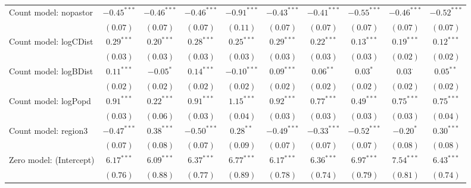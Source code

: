 \begin{sidewaystable}
\begin{center}
{\begin{tabular}{l c c c c c c c c c}
Count model: nopastor          & $-0.45^{***}$ & $-0.46^{***}$ & $-0.46^{***}$ & $-0.91^{***}$ & $-0.43^{***}$  & $-0.41^{***}$ & $-0.55^{***}$ & $-0.46^{***}$  & $-0.52^{***}$  \\
                               & $(0.07)$      & $(0.07)$      & $(0.07)$      & $(0.11)$      & $(0.07)$       & $(0.07)$      & $(0.07)$      & $(0.07)$       & $(0.07)$       \\
Count model: logCDist          & $0.29^{***}$  & $0.20^{***}$  & $0.28^{***}$  & $0.25^{***}$  & $0.29^{***}$   & $0.22^{***}$  & $0.13^{***}$  & $0.19^{***}$   & $0.12^{***}$   \\
                               & $(0.03)$      & $(0.03)$      & $(0.03)$      & $(0.03)$      & $(0.03)$       & $(0.03)$      & $(0.03)$      & $(0.02)$       & $(0.02)$       \\
Count model: logBDist          & $0.11^{***}$  & $-0.05^{*}$   & $0.14^{***}$  & $-0.10^{***}$ & $0.09^{***}$   & $0.06^{**}$   & $0.03^{*}$    & $0.03^{\cdot}$ & $0.05^{**}$    \\
                               & $(0.02)$      & $(0.02)$      & $(0.02)$      & $(0.02)$      & $(0.02)$       & $(0.02)$      & $(0.02)$      & $(0.02)$       & $(0.02)$       \\
Count model: logPopd           & $0.91^{***}$  & $0.22^{***}$  & $0.91^{***}$  & $1.15^{***}$  & $0.92^{***}$   & $0.77^{***}$  & $0.49^{***}$  & $0.75^{***}$   & $0.75^{***}$   \\
                               & $(0.03)$      & $(0.06)$      & $(0.03)$      & $(0.04)$      & $(0.03)$       & $(0.03)$      & $(0.03)$      & $(0.03)$       & $(0.04)$       \\
Count model: region3           & $-0.47^{***}$ & $0.38^{***}$  & $-0.50^{***}$ & $0.28^{**}$   & $-0.49^{***}$  & $-0.33^{***}$ & $-0.52^{***}$ & $-0.20^{*}$    & $0.30^{***}$   \\
                               & $(0.07)$      & $(0.08)$      & $(0.07)$      & $(0.09)$      & $(0.07)$       & $(0.07)$      & $(0.07)$      & $(0.08)$       & $(0.08)$       \\
Zero model: (Intercept)        & $6.17^{***}$  & $6.09^{***}$  & $6.37^{***}$  & $6.77^{***}$  & $6.17^{***}$   & $6.36^{***}$  & $6.97^{***}$  & $7.54^{***}$   & $6.43^{***}$   \\
                               & $(0.76)$      & $(0.88)$      & $(0.77)$      & $(0.89)$      & $(0.78)$       & $(0.74)$      & $(0.79)$      & $(0.81)$       & $(0.74)$       \\

\end{tabular}}
\end{center}
\end{sidewaystable}
